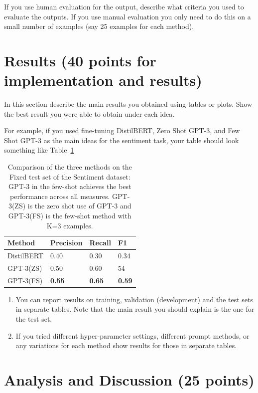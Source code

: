 \documentclass[11pt,a4paper]{article}
\begin{document}
If you use human evaluation for the output, describe what criteria you used to evaluate the outputs. If you use manual evaluation you only need to do this on a small number of examples (say 25 examples for each method).

\section{Results (40 points for implementation and results)}

In this section describe the main results you obtained using tables or plots. Show the best result you were able to obtain under each idea.

For example, if you used fine-tuning DistilBERT, Zero Shot GPT-3, and Few Shot GPT-3 as the main ideas for the sentiment task, your table should look something like Table~\ref{tab:results}

\begin{table}[t!]
\begin{tabular}{l|l|l|l}
\hline
Method & Precision & Recall & F1\\
\hline
DistilBERT & 0.40 & 0.30 & 0.34 \\
GPT-3(ZS) & 0.50 & 0.60 & 54 \\
GPT-3(FS) & \textbf{0.55} & \textbf{0.65} & \textbf{0.59}\\
\hline
\end{tabular}
\caption{Comparison of the three methods on the Fixed test set of the Sentiment dataset: GPT-3 in the few-shot achieves the best performance across all measures. GPT-3(ZS) is the zero shot use of GPT-3 and GPT-3(FS) is the few-shot method with K=3 examples.}
\label{tab:results}
\end{table} 

\begin{enumerate}

\item You can report results on training, validation (development) and the test sets in separate tables. Note that the main result you should explain is the one for the test set. 

\item If you tried different hyper-parameter settings, different prompt methods, or any variations for each method show results for those in separate tables.
\end{enumerate}


\section{Analysis and Discussion (25 points)}
\end{document}
